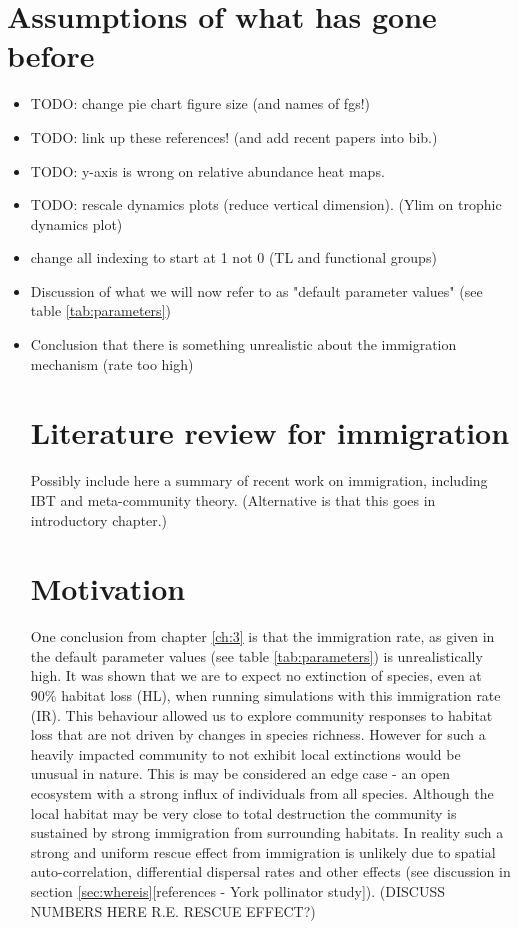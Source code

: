 \section{Assumptions of what has gone before}

\begin{itemize}
	\item TODO: change pie chart figure size (and names of fgs!)
	\item TODO: link up these references! (and add recent papers into bib.)
	\item TODO: y-axis is wrong on relative abundance heat maps.	
	\item TODO: rescale dynamics plots (reduce vertical dimension). (Ylim on trophic dynamics plot)
	\item change all indexing to start at 1 not 0 (TL and functional groups)
	\item Discussion of what we will now refer to as "default parameter values" (see table \ref{tab:parameters})
	\item Conclusion that there is something unrealistic about the immigration mechanism (rate too high)
	
\cite{ripple2012trophic}

\section{Literature review for immigration}

Possibly include here a summary of recent work on immigration, including IBT and meta-community theory. (Alternative is that this goes in introductory chapter.) 

\section{Motivation}
\label{sec:motivate_immigration}

One conclusion from chapter \ref{ch:3} is that the immigration rate, as given in the default parameter values (see table \ref{tab:parameters}) is unrealistically high. It was shown that we are to expect no extinction of species, even at $90\%$ habitat loss (HL), when running simulations with this immigration rate (IR). This behaviour allowed us to explore community responses to habitat loss that are not driven by changes in species richness. However for such a heavily impacted community to not exhibit local extinctions would be unusual in nature. This is may be considered an edge case - an open ecosystem with a strong influx of individuals from all species. Although the local habitat may be very close to total destruction the community is sustained by strong immigration from surrounding habitats. In reality such a strong and uniform rescue effect from immigration is unlikely due to spatial auto-correlation, differential dispersal rates and other effects (see discussion in section \ref{sec:whereis}[references - York pollinator study]).  (DISCUSS NUMBERS HERE R.E. RESCUE EFFECT?)
  

\end{itemize}
